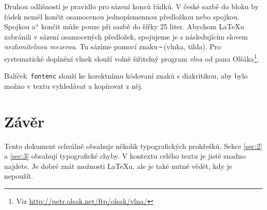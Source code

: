 \documentclass[a4paper,twocolumn,10pt]{article}
\newcommand{\czuv}[1]{\quotedblbase #1\textquotedblleft}
\begin{document}
Druhou odlišností je pravidlo pro sázení konců řádků.
V české sazbě do bloku by řádek neměl končit osamoce\-nou jednopísmennou předložkou nebo spojkou.
Spojkou \czuv{a} končit může pouze při sazbě do šířky 25 liter.
Abychom \LaTeX u zabránili v sázení osamocených předložek, spoju\-jeme je s následujícím slovem \emph{nezlomitelnou mezerou}.
Tu sázíme pomocí znaku\,\verb|~|\,(vlnka, tilda).
Pro systematické do\-plnění vlnek slouží volně šiřitelný program \emph{vlna} od pana Olšáka\footnote{Viz \url{http://petr.olsak.net/ftp/olsak/vlna/}}.

Balíček\, \texttt{fontenc} slouží ke korektnímu kódovaní znaků s diakritikou, aby bylo možno v textu vyhledávat a kopírovat z něj.
\section{Závěr}
Tento dokument schválně obsahuje několik typografických prohřešků.
Sekce \ref{sec:2} a \ref{sec:3} obsahují typografické chyby.
V kontextu celého textu je jistě snadno najdete.
Je dobré znát možnosti \LaTeX u, ale je také nutné vědět, kdy je nepoužít.
\end{document}
